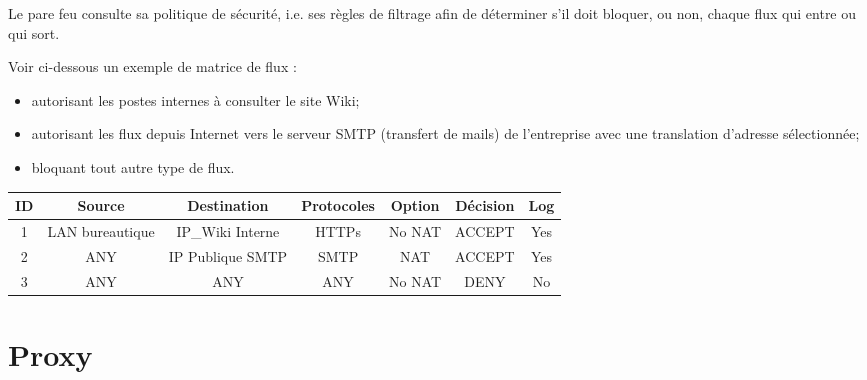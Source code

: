 Le pare feu consulte sa politique de sécurité, i.e. ses règles de filtrage afin de déterminer s'il doit bloquer, ou non, chaque flux qui entre ou qui sort.

Voir ci-dessous un exemple de matrice de flux : 
\begin{itemize}
    \item autorisant les postes internes à consulter le site Wiki;
    \item autorisant les flux depuis Internet vers le serveur SMTP (transfert de mails) de l'entreprise avec une translation d'adresse sélectionnée;
    \item bloquant tout autre type de flux.
\end{itemize}

\begin{center}
\begin{tabular}{||c c c c c c c ||} 
 \hline
 ID & Source & Destination & Protocoles & Option & Décision & Log \\ [0.5ex] 
 \hline\hline
 1 & LAN bureautique & IP_Wiki Interne & HTTPs & No NAT & ACCEPT & Yes \\ 
 \hline
 2 & ANY & IP Publique SMTP & SMTP & NAT & ACCEPT & Yes \\
 \hline
 3 & ANY & ANY & ANY & No NAT & DENY & No \\
 \hline
\end{tabular}
\end{center}


\section{Proxy}

